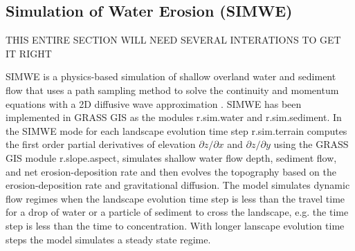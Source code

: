 \documentclass[gmd, manuscript]{copernicus}
\begin{document}
\subsection{Simulation of Water Erosion (SIMWE)} \label{simwe}

THIS ENTIRE SECTION WILL NEED SEVERAL INTERATIONS TO GET IT RIGHT

SIMWE is a physics-based simulation of shallow overland water and sediment flow
that uses a path sampling method to solve the continuity and momentum equations 
with a 2D diffusive wave approximation 
\citep{Mitas1998,Mitasova2004}.
SIMWE has been implemented in GRASS GIS as the modules 
r.sim.water
and r.sim.sediment. 
In the SIMWE mode for each landscape evolution time step
r.sim.terrain
computes the first order partial derivatives of elevation 
$\partial z / \partial x$ and $\partial z / \partial y$ 
using the GRASS GIS module r.slope.aspect,
simulates shallow water flow depth, sediment flow, and net erosion-deposition rate 
and then evolves the topography based on the erosion-deposition rate
and gravitational diffusion. 
%
The model simulates dynamic flow regimes
when the landscape evolution time step is less than the travel time 
for a drop of water or a particle of sediment to cross the landscape,
e.g. the time step is less than the time to concentration.
With longer lanscape evolution time steps the model simulates a steady state regime. 

% 
\end{document}
